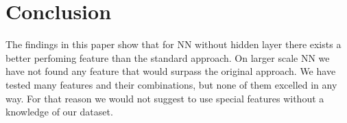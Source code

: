 \documentclass[journal]{IEEEtran}
\begin{document}
\section{Conclusion}
The findings in this paper show that for NN without hidden layer there exists a better perfoming feature than the standard approach. On larger scale NN we have not found any feature that would surpass the original approach. We have tested many features and their combinations, but none of them excelled in any way. For that reason we would not suggest to use special features without a knowledge of our dataset.

\nocite{*}



\end{document}

